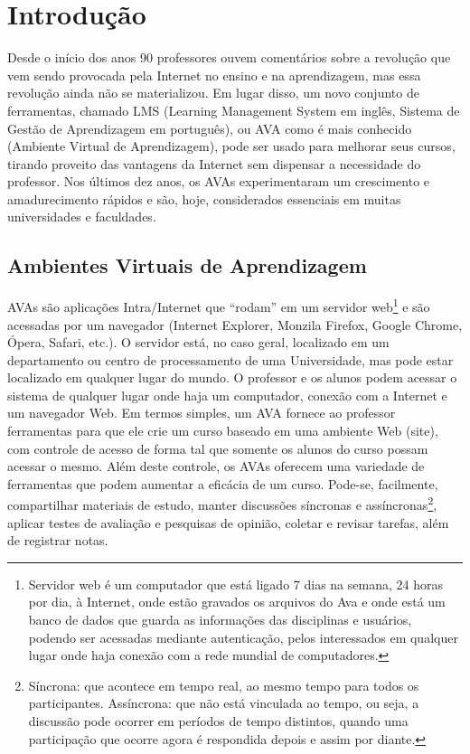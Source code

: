 \chapter{Introdução}


Desde o início dos anos 90 professores ouvem comentários sobre a revolução que vem sendo provocada pela Internet no ensino e na aprendizagem, mas essa revolução ainda não se materializou. Em lugar disso, um novo conjunto de ferramentas, chamado LMS (Learning Management System em inglês, Sistema de Gestão de Aprendizagem em português), ou AVA como é mais conhecido (Ambiente Virtual de Aprendizagem), pode ser usado para melhorar seus cursos, tirando proveito das vantagens da Internet sem dispensar a necessidade do professor. Nos últimos dez anos, os AVAs experimentaram um crescimento e amadurecimento rápidos e são, hoje, considerados essenciais em muitas universidades e faculdades.


\section{Ambientes Virtuais de Aprendizagem}

AVAs são aplicações Intra/Internet que “rodam” em um servidor web\footnote{Servidor web é um computador que está ligado 7 dias na semana, 24 horas por dia, à Internet, onde estão gravados os arquivos do Ava e onde está um banco de dados que guarda as informações das disciplinas e usuários, podendo ser acessadas mediante autenticação, pelos interessados em qualquer lugar onde haja conexão com a rede mundial de computadores.}  e são acessadas por um navegador (Internet Explorer, Monzila Firefox, Google Chrome, Ópera, Safari, etc.). O servidor está, no caso geral, localizado em um departamento ou centro de processamento de uma Universidade, mas pode estar localizado em qualquer lugar do mundo. O professor e os alunos podem acessar o sistema de qualquer lugar onde haja um computador, conexão com a Internet e um navegador Web. Em termos simples, um AVA fornece ao professor ferramentas para que ele crie um curso baseado em uma ambiente Web (site), com controle de acesso de forma tal que somente os alunos do curso possam acessar o mesmo. Além deste controle, os AVAs oferecem uma variedade de ferramentas que podem aumentar a eficácia de um curso. Pode-se, facilmente, compartilhar materiais de estudo, manter discussões síncronas e assíncronas\footnote{Síncrona: que acontece em tempo real, ao mesmo tempo para todos os participantes. Assíncrona: que não está vinculada ao tempo, ou seja, a discussão pode ocorrer em períodos de tempo distintos, quando uma participação que ocorre agora é respondida depois e assim por diante.}, aplicar testes de avaliação e pesquisas de opinião, coletar e revisar tarefas, além de registrar notas. 

